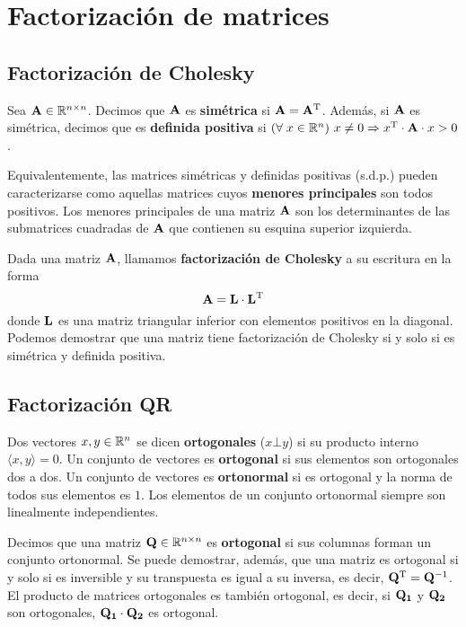 
\section{Factorización de matrices}
\subsection{Factorización de Cholesky}

Sea $\mathbf{A} \in \mathbb{R}^{n \times n}$. Decimos que $\mathbf{A}$ es
\textbf{simétrica} si $\mathbf{A} = \mathbf{A}^{\mathrm{T}}$. Además, si $\mathbf{A}$ es
simétrica, decimos que es \textbf{definida positiva} si
$\left(\forall\;x \in \mathbb{R}^{n}\right)\, x \neq 0 \Rightarrow x^{\mathrm{T}} \cdot \mathbf{A} \cdot x > 0$.

Equivalentemente, las matrices simétricas y definidas positivas (s.d.p.)
pueden caracterizarse como aquellas matrices cuyos \textbf{menores
principales} son todos positivos. Los menores principales de una matriz
$\mathbf{A}$ son los determinantes de las submatrices cuadradas de $\mathbf{A}$ que
contienen su esquina superior izquierda.

Dada una matriz $\mathbf{A}$, llamamos \textbf{factorización de Cholesky} a su
escritura en la forma
\[ \mathbf{A} = \mathbf{L} \cdot \mathbf{L}^{\mathrm{T}} \]
donde $\mathbf{L}$ es una matriz triangular inferior con elementos positivos
en la diagonal. Podemos demostrar que una matriz tiene factorización de
Cholesky si y solo si es simétrica y definida positiva.

\subsection{Factorización QR}

Dos vectores $x, y \in \mathbb{R}^{n}$ se dicen \textbf{ortogonales} ($x \bot y$)
si su producto interno $\langle x,y \rangle = 0$. Un conjunto de vectores es
\textbf{ortogonal} si sus elementos son ortogonales dos a dos. Un conjunto de
vectores es \textbf{ortonormal} si es ortogonal y la norma de todos sus
elementos es $1$. Los elementos de un conjunto ortonormal siempre son
linealmente independientes.

Decimos que una matriz $\mathbf{Q} \in \mathbb{R}^{n \times n}$ es \textbf{ortogonal}
si sus columnas forman un conjunto ortonormal. Se puede demostrar, además, que
una matriz es ortogonal si y solo si es inversible y su transpuesta es igual a
su inversa, es decir, $\mathbf{Q}^{\mathrm{T}} = \mathbf{Q}^{-1}$. El producto de matrices
ortogonales es también ortogonal, es decir, si $\mathbf{Q_1}$ y $\mathbf{Q_2}$ son
ortogonales, $\mathbf{Q_1} \cdot \mathbf{Q_2}$ es ortogonal.

